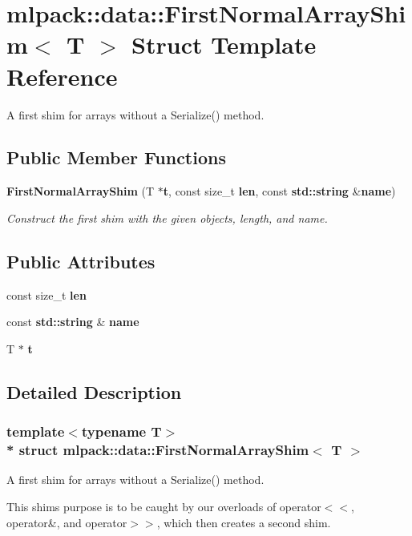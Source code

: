 \section{mlpack\+:\+:data\+:\+:First\+Normal\+Array\+Shim$<$ T $>$ Struct Template Reference}
\label{structmlpack_1_1data_1_1FirstNormalArrayShim}


A first shim for arrays without a Serialize() method.  


\subsection*{Public Member Functions}
\begin{DoxyCompactItemize}
\item 
{\bf First\+Normal\+Array\+Shim} (T $\ast${\bf t}, const size\+\_\+t {\bf len}, const {\bf std\+::string} \&{\bf name})
\begin{DoxyCompactList}\small\item\em Construct the first shim with the given objects, length, and name. \end{DoxyCompactList}\end{DoxyCompactItemize}
\subsection*{Public Attributes}
\begin{DoxyCompactItemize}
\item 
const size\+\_\+t {\bf len}
\item 
const {\bf std\+::string} \& {\bf name}
\item 
T $\ast$ {\bf t}
\end{DoxyCompactItemize}


\subsection{Detailed Description}
\subsubsection*{template$<$typename T$>$\\*
struct mlpack\+::data\+::\+First\+Normal\+Array\+Shim$<$ T $>$}

A first shim for arrays without a Serialize() method. 

This shim\textquotesingle{}s purpose is to be caught by our overloads of operator$<$$<$, operator\&, and operator$>$$>$, which then creates a second shim. 

